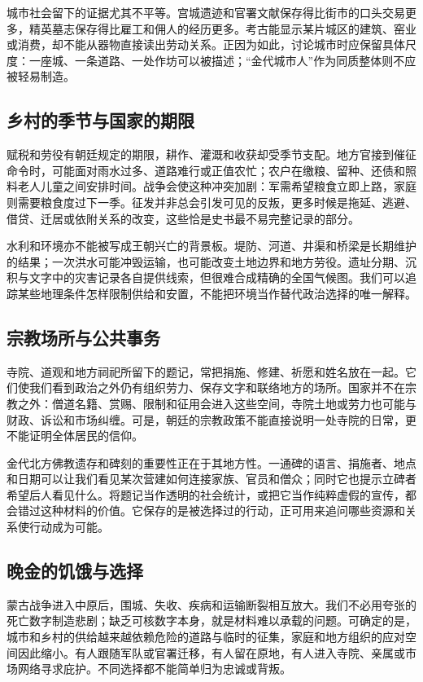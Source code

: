 城市社会留下的证据尤其不平等。宫城遗迹和官署文献保存得比街市的口头交易更多，精英墓志保存得比雇工和佣人的经历更多。考古能显示某片城区的建筑、窑业或消费，却不能从器物直接读出劳动关系。正因为如此，讨论城市时应保留具体尺度：一座城、一条道路、一处作坊可以被描述；“金代城市人”作为同质整体则不应被轻易制造。

\subsection{乡村的季节与国家的期限}

赋税和劳役有朝廷规定的期限，耕作、灌溉和收获却受季节支配。地方官接到催征命令时，可能面对雨水过多、道路难行或正值农忙；农户在缴粮、留种、还债和照料老人儿童之间安排时间。战争会使这种冲突加剧：军需希望粮食立即上路，家庭则需要粮食度过下一季。征发并非总会引发可见的反叛，更多时候是拖延、逃避、借贷、迁居或依附关系的改变，这些恰是史书最不易完整记录的部分。

水利和环境亦不能被写成王朝兴亡的背景板。堤防、河道、井渠和桥梁是长期维护的结果；一次洪水可能冲毁运输，也可能改变土地边界和地方劳役。遗址分期、沉积与文字中的灾害记录各自提供线索，但很难合成精确的全国气候图。我们可以追踪某些地理条件怎样限制供给和安置，不能把环境当作替代政治选择的唯一解释。

\subsection{宗教场所与公共事务}

寺院、道观和地方祠祀所留下的题记，常把捐施、修建、祈愿和姓名放在一起。它们使我们看到政治之外仍有组织劳力、保存文字和联络地方的场所。国家并不在宗教之外：僧道名籍、赏赐、限制和征用会进入这些空间，寺院土地或劳力也可能与财政、诉讼和市场纠缠。可是，朝廷的宗教政策不能直接说明一处寺院的日常，更不能证明全体居民的信仰。

金代北方佛教遗存和碑刻的重要性正在于其地方性。一通碑的语言、捐施者、地点和日期可以让我们看见某次营建如何连接家族、官员和僧众；同时它也提示立碑者希望后人看见什么。将题记当作透明的社会统计，或把它当作纯粹虚假的宣传，都会错过这种材料的价值。它保存的是被选择过的行动，正可用来追问哪些资源和关系使行动成为可能。

\subsection{晚金的饥饿与选择}

蒙古战争进入中原后，围城、失收、疾病和运输断裂相互放大。我们不必用夸张的死亡数字制造悲剧；缺乏可核数字本身，就是材料难以承载的问题。可确定的是，城市和乡村的供给越来越依赖危险的道路与临时的征集，家庭和地方组织的应对空间因此缩小。有人跟随军队或官署迁移，有人留在原地，有人进入寺院、亲属或市场网络寻求庇护。不同选择都不能简单归为忠诚或背叛。

